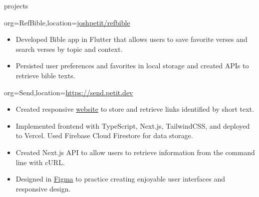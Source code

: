 \documentclass{resume}
\begin{document}
\begin{ResumeSection}{projects}
    \begin{ResumeSubsection}{org={RefBible},location={\href{https://github.com/joshpetit/refbible}{joshpetit/refbible}}}
        \begin{itemize}
            \item {Developed Bible app in Flutter that allows users to save
                favorite verses and search verses by topic and context.} 
            \item {Persisted user preferences and favorites in local storage and
                created APIs to retrieve bible texts.}
        \end{itemize}
    \end{ResumeSubsection}
    \begin{ResumeSubsection}{org={Send},location={\href{https://send.petit.dev}{https://send.petit.dev}}}
        \begin{itemize}
            \item {Created responsive \href{https://send.petit.dev}{website} to store and retrieve links identified by short text.}
            \item {Implemented frontend with TypeScript, Next.js, TailwindCSS, and deployed to Vercel. Used Firebase Cloud Firestore for data storage.}
            \item {Created Next.js API to allow users to retrieve information from the command line with cURL.}
            \item {Designed in
                    \href{https://www.figma.com/file/Rn2hStoJfozlgsvSoEeGnj/Send?node-id=139%3A2}{Figma}
                    to practice creating enjoyable user
                interfaces and responsive design.}
        \end{itemize}
    \end{ResumeSubsection}

\end{ResumeSection}
\end{document}
